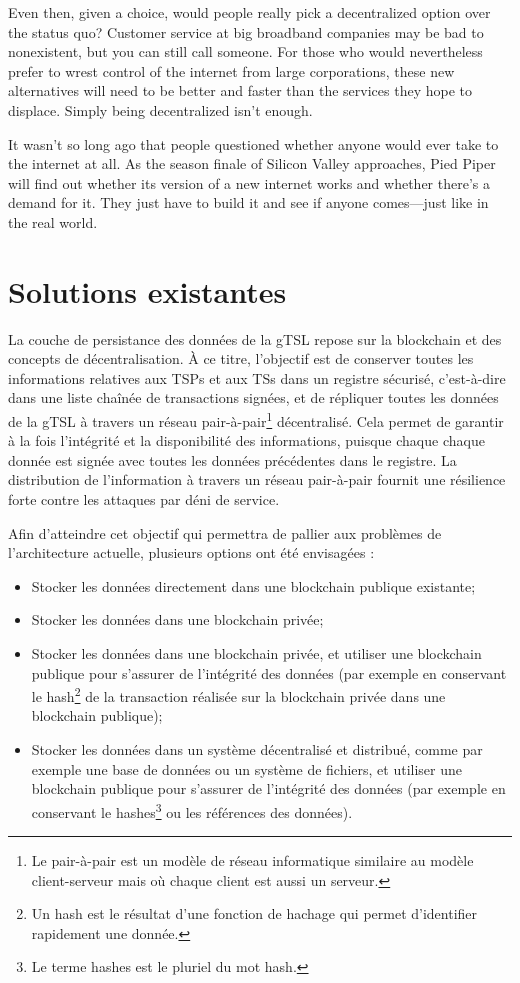 \documentclass{tnreport}
\begin{document}
Even then, given a choice, would people really pick a decentralized option over the status quo? Customer service at big broadband companies may be bad to nonexistent, but you can still call someone. For those who would nevertheless prefer to wrest control of the internet from large corporations, these new alternatives will need to be better and faster than the services they hope to displace. Simply being decentralized isn't enough.

It wasn't so long ago that people questioned whether anyone would ever take to the internet at all. As the season finale of Silicon Valley approaches, Pied Piper will find out whether its version of a new internet works and whether there's a demand for it. They just have to build it and see if anyone comes—just like in the real world.

\section{Solutions existantes}
\label{sec:solutions}

La couche de persistance des données de la gTSL repose sur la blockchain et des concepts de décentralisation. À ce titre, l'objectif est de conserver toutes les informations relatives aux TSPs et aux TSs dans un registre sécurisé, c'est-à-dire dans une liste chaînée de transactions signées, et de répliquer toutes les données de la gTSL à travers un réseau pair-à-pair\footnote{Le pair-à-pair est un modèle de réseau informatique similaire au modèle client-serveur mais où chaque client est aussi un serveur.} décentralisé.
Cela permet de garantir à la fois l'intégrité et la disponibilité des informations, puisque chaque chaque donnée est signée avec toutes les données précédentes dans le registre. La distribution de l'information à travers un réseau pair-à-pair fournit une résilience forte contre les attaques par déni de service.

Afin d'atteindre cet objectif qui permettra de pallier aux problèmes de l'architecture actuelle, plusieurs options ont été envisagées :
\begin{itemize}
	\item Stocker les données directement dans une blockchain publique existante;
	\item Stocker les données dans une blockchain privée;
	\item Stocker les données dans une blockchain privée, et utiliser une blockchain publique pour s'assurer de l'intégrité des données (par exemple en conservant le hash\footnote{Un hash est le résultat d'une fonction de hachage qui permet d'identifier rapidement une donnée.} de la transaction réalisée sur la blockchain privée dans une blockchain publique);
	\item Stocker les données dans un système décentralisé et distribué, comme par exemple une base de données ou un système de fichiers, et utiliser une blockchain publique pour s'assurer de l'intégrité des données (par exemple en conservant le hashes\footnote{Le terme hashes est le pluriel du mot hash.} ou les références des données).
\end{itemize}
\end{document}
